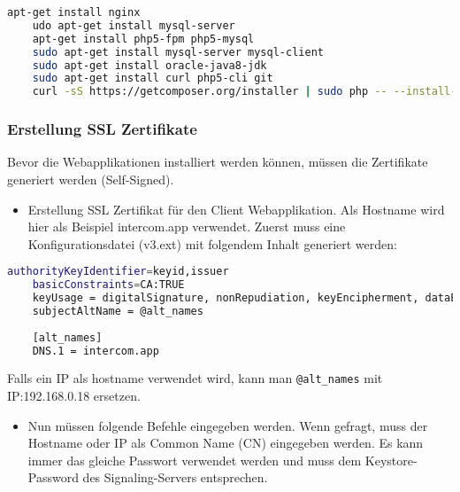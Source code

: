 \begin{lstlisting}[backgroundcolor = \color{snippetcolor},
language = bash,
xleftmargin = 0.5cm,
framexleftmargin = 0.1em,
breaklines=true]
	apt-get install nginx
	udo apt-get install mysql-server
	apt-get install php5-fpm php5-mysql
	sudo apt-get install mysql-server mysql-client
	sudo apt-get install oracle-java8-jdk
	sudo apt-get install curl php5-cli git
	curl -sS https://getcomposer.org/installer | sudo php -- --install-dir=/usr/local/bin --filename=composer
\end{lstlisting}

\subsubsection{Erstellung SSL Zertifikate}
\label{kap:zertifikategen}
Bevor die Webapplikationen installiert werden können, müssen die Zertifikate generiert werden (Self-Signed).

\begin{itemize}
	\item Erstellung SSL Zertifikat für den Client Webapplikation. Als Hostname wird hier als Beispiel intercom.app verwendet. Zuerst muss eine Konfigurationsdatei (v3.ext) mit folgendem Inhalt generiert werden:
\end{itemize}

\begin{lstlisting}[backgroundcolor = \color{snippetcolor},
language = bash,
xleftmargin = 0.5cm,
framexleftmargin = 0.1em,
breaklines=true]
	authorityKeyIdentifier=keyid,issuer
	basicConstraints=CA:TRUE
	keyUsage = digitalSignature, nonRepudiation, keyEncipherment, dataEncipherment
	subjectAltName = @alt_names
	
	[alt_names]
	DNS.1 = intercom.app
\end{lstlisting}
Falls ein IP als hostname verwendet wird, kann man \texttt{@alt\_names} mit IP:192.168.0.18 ersetzen.

\begin{itemize}
	\item 
	Nun müssen folgende Befehle eingegeben werden. Wenn gefragt, muss der Hostname oder IP als Common Name (CN) eingegeben werden. Es kann immer das gleiche Passwort verwendet werden und muss dem Keystore-Password des Signaling-Servers entsprechen.
\end{itemize}

